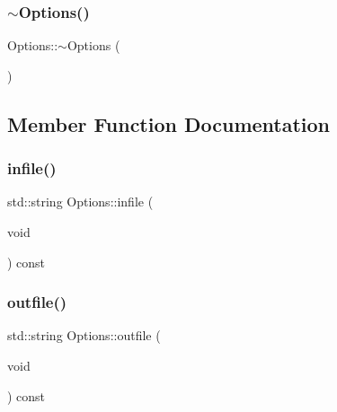 \mbox{\label{class_options_a86ddb85b183f8b58af5481f30a42fa92}} 
\subsubsection{\texorpdfstring{$\sim$\+Options()}{~Options()}}
{\footnotesize\ttfamily Options\+::$\sim$\+Options (\begin{DoxyParamCaption}{ }\end{DoxyParamCaption})}



\subsection{Member Function Documentation}
\mbox{\label{class_options_af5fc0ecb4b117c5438f07762fa7f565a}} 
\subsubsection{\texorpdfstring{infile()}{infile()}}
{\footnotesize\ttfamily std\+::string Options\+::infile (\begin{DoxyParamCaption}\item[{void}]{ }\end{DoxyParamCaption}) const\hspace{0.3cm}{\ttfamily [inline]}}

\mbox{\label{class_options_a35e8029289fef81902b98422e5b9aff8}} 
\subsubsection{\texorpdfstring{outfile()}{outfile()}}
{\footnotesize\ttfamily std\+::string Options\+::outfile (\begin{DoxyParamCaption}\item[{void}]{ }\end{DoxyParamCaption}) const\hspace{0.3cm}{\ttfamily [inline]}}

\mbox{\label{class_options_a6d00df300abbec9c39990eb8858f1255}} 

